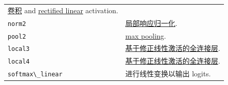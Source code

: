 \begin{longtable}[c]{@{}ll@{}}
\begin{minipage}[t]{0.05\columnwidth}\raggedright\strut
\href{https://github.com/jikexueyuanwiki/tensorflow-zh/blob/master/SOURCE/api_docs/python/nn.md\#conv2d}{卷积}
and
\href{https://github.com/jikexueyuanwiki/tensorflow-zh/blob/master/SOURCE/api_docs/python/nn.md\#relu}{rectified
linear} activation.
\strut\end{minipage}\tabularnewline
\begin{minipage}[t]{0.05\columnwidth}\raggedright\strut
\lstinline{norm2}
\strut\end{minipage} &
\begin{minipage}[t]{0.05\columnwidth}\raggedright\strut
\href{https://github.com/jikexueyuanwiki/tensorflow-zh/blob/master/SOURCE/api_docs/python/nn.md\#local_response_normalization}{局部响应归一化}.
\strut\end{minipage}\tabularnewline
\begin{minipage}[t]{0.05\columnwidth}\raggedright\strut
\lstinline{pool2}
\strut\end{minipage} &
\begin{minipage}[t]{0.05\columnwidth}\raggedright\strut
\href{https://github.com/jikexueyuanwiki/tensorflow-zh/blob/master/SOURCE/api_docs/python/nn.md\#max_pool}{max
pooling}.
\strut\end{minipage}\tabularnewline
\begin{minipage}[t]{0.05\columnwidth}\raggedright\strut
\lstinline{local3}
\strut\end{minipage} &
\begin{minipage}[t]{0.05\columnwidth}\raggedright\strut
\href{https://github.com/jikexueyuanwiki/tensorflow-zh/blob/master/SOURCE/api_docs/python/nn.md}{基于修正线性激活的全连接层}.
\strut\end{minipage}\tabularnewline
\begin{minipage}[t]{0.05\columnwidth}\raggedright\strut
\lstinline{local4}
\strut\end{minipage} &
\begin{minipage}[t]{0.05\columnwidth}\raggedright\strut
\href{https://github.com/jikexueyuanwiki/tensorflow-zh/blob/master/SOURCE/api_docs/python/nn.md}{基于修正线性激活的全连接层}.
\strut\end{minipage}\tabularnewline
\begin{minipage}[t]{0.05\columnwidth}\raggedright\strut
\lstinline{softmax\_linear}
\strut\end{minipage} &
\begin{minipage}[t]{0.05\columnwidth}\raggedright\strut
进行线性变换以输出 logits.
\strut\end{minipage}\tabularnewline
\bottomrule
\end{longtable}


